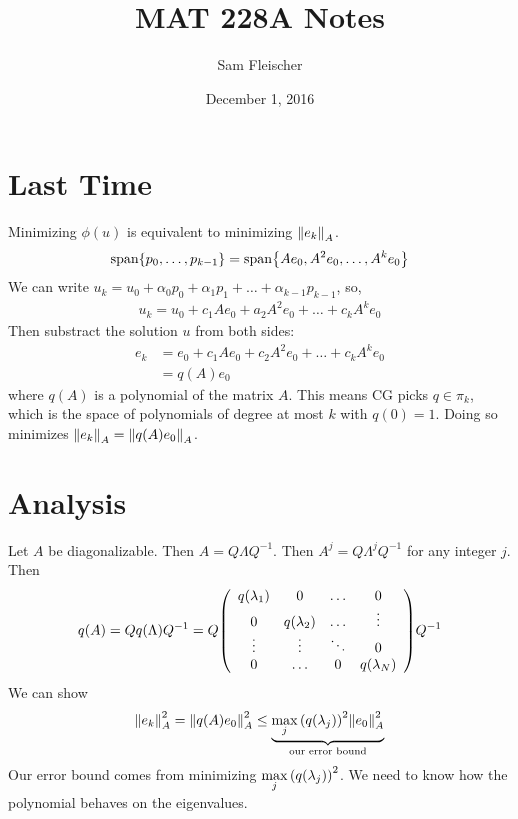 \documentclass{article}
\title{MAT 228A Notes}
\author{Sam Fleischer}
\date{December 1, 2016}
\begin{document}
    \maketitle

    \section{Last Time}
        Minimizing $\phi(u)$ is equivalent to minimizing $\norm{e_k}_A$.
        \begin{align*}
            \text{span}\qty{p_0, \dots, p_{k-1}} = \text{span}\qty{Ae_0,A^2e_0,\dots,A^ke_0}
        \end{align*}
        We can write $u_k = u_0 + \alpha_0p_0 + \alpha_1p_1 + \dots + \alpha_{k-1}p_{k-1}$, so,
        \begin{align*}
            u_k = u_0 + c_1Ae_0 + a_2A^2e_0 + \dots + c_kA^ke_0
        \end{align*}
        Then substract the solution $u$ from both sides:
        \begin{align*}
            e_k &= e_0 + c_1Ae_0 + c_2A^2e_0 + \dots + c_kA^ke_0 \\
            &= q(A)e_0
        \end{align*}
        where $q(A)$ is a polynomial of the matrix $A$.  This means CG picks $q\in\pi_k$, which is the space of polynomials of degree at most $k$ with $q(0) = 1$.  Doing so minimizes $\norm{e_k}_A = \norm{q(A)e_0}_A$.

    \section{Analysis}
        Let $A$ be diagonalizable.  Then $A = Q\Lambda Q^{-1}$.  Then $A^j = Q\Lambda^jQ^{-1}$ for any integer $j$.  Then
        \begin{align*}
            q(A) = Qq(\Lambda)Q^{-1} = Q\qty(\begin{array}{cccc}
                q(\lambda_1) & 0 & \dots & 0\\
                0 & q(\lambda_2) & \dots & \vdots \\
                \vdots & \vdots & \ddots & 0 \\
                0 & \dots & 0 & q(\lambda_N)
            \end{array})Q^{-1}
        \end{align*}
        We can show
        \begin{align*}
            \norm{e_k}_A^2 = \norm{q(A)e_0}_A^2 \leq \underbrace{\max_j\qty(q(\lambda_j))^2\norm{e_0}_A^2}_\text{our error bound}
        \end{align*}
        Our error bound comes from minimizing $\displaystyle\max_j\qty(q(\lambda_j))^2$.  We need to know how the polynomial behaves on the eigenvalues.
\end{document}
